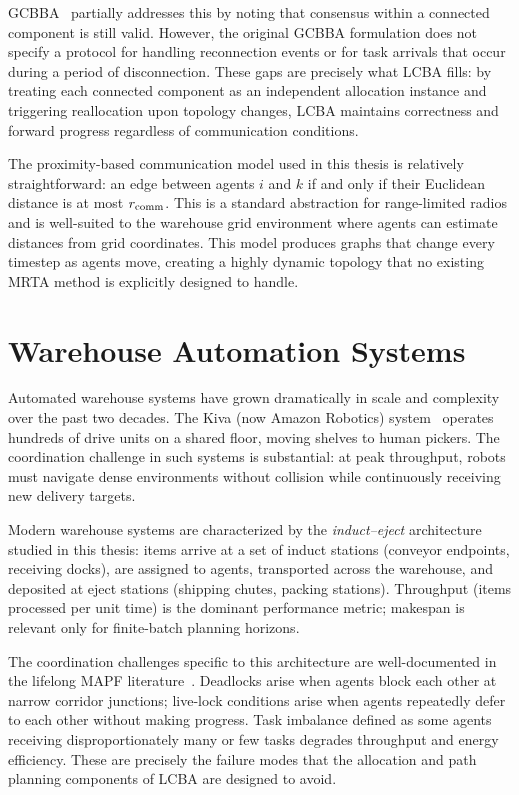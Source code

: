 GCBBA~\cite{kha2025enhancing} partially addresses this by noting that
consensus within a connected component is still valid.
However, the original GCBBA formulation does not specify a protocol for
handling reconnection events or for task arrivals that occur during a period
of disconnection.
These gaps are precisely what LCBA fills: by treating each connected component
as an independent allocation instance and triggering reallocation upon topology
changes, LCBA maintains correctness and forward progress regardless of
communication conditions.

The proximity-based communication model used in this thesis is relatively straightforward:
an edge between
agents $i$ and $k$ if and only if their Euclidean distance is at most $r_{\text{comm}}$.
 This is a standard abstraction for range-limited radios and is well-suited to
the warehouse grid environment where agents can estimate distances from
grid coordinates.
This model produces graphs that change every timestep as agents move, creating
a highly dynamic topology that no existing MRTA method is explicitly designed
to handle.


\section{Warehouse Automation Systems}
\label{sec:bg_warehouse}

Automated warehouse systems have grown dramatically in scale and complexity
over the past two decades.
The Kiva (now Amazon Robotics) system~\cite{wurman2008coordinating} operates
hundreds of drive units on a shared floor, moving shelves to human pickers.
The coordination challenge in such systems is substantial: at peak throughput,
robots must navigate dense environments without collision while continuously
receiving new delivery targets.

Modern warehouse systems are characterized by the \emph{induct--eject}
architecture studied in this thesis: items arrive at a set of induct stations
(conveyor endpoints, receiving docks), are assigned to agents, transported
across the warehouse, and deposited at eject stations (shipping chutes, packing
stations).
Throughput (items processed per unit time) is the dominant performance
metric; makespan is relevant only for finite-batch planning horizons.

The coordination challenges specific to this architecture are well-documented
in the lifelong MAPF literature~\cite{li2021lifelong}.
Deadlocks arise when agents block each other at narrow corridor junctions;
live-lock conditions arise when agents repeatedly defer to each other without
making progress.
Task imbalance defined as some agents receiving disproportionately many or few tasks
degrades throughput and energy efficiency.
These are precisely the failure modes that the allocation and path planning
components of LCBA are designed to avoid.

